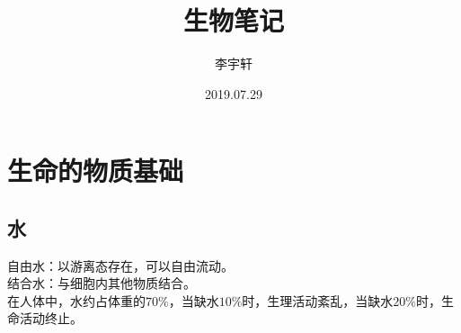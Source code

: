 \documentclass[UTF8]{ctexart}
\title{生物笔记}
\author{李宇轩}
\date{2019.07.29}
\begin{document}
\maketitle

\newpage

\tableofcontents

\newpage

\setlength{\parindent}{0pt}

\section{生命的物质基础}

\subsection{水}
    自由水：以游离态存在，可以自由流动。\\[3mm]
    结合水：与细胞内其他物质结合。\\[3mm]
    在人体中，水约占体重的$70\%$，当缺水$10\%$时，生理活动紊乱，当缺水$20\%$时，生命活动终止。
\end{document}
